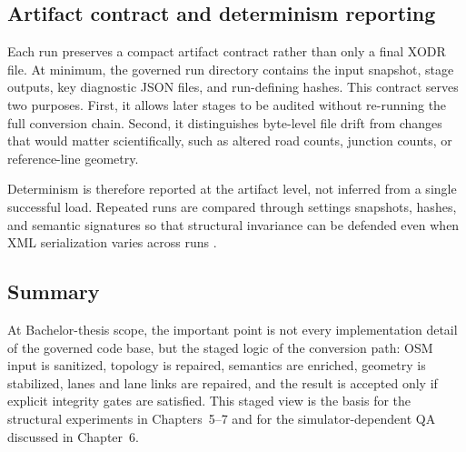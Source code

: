 \subsection{Artifact contract and determinism reporting}
\label{sec:artifact_contract_pipeline}
Each run preserves a compact artifact contract rather than only a final XODR file. At minimum, the governed run directory contains the input snapshot, stage outputs, key diagnostic JSON files, and run-defining hashes. This contract serves two purposes. First, it allows later stages to be audited without re-running the full conversion chain. Second, it distinguishes byte-level file drift from changes that would matter scientifically, such as altered road counts, junction counts, or reference-line geometry.

Determinism is therefore reported at the artifact level, not inferred from a single successful load. Repeated runs are compared through settings snapshots, hashes, and semantic signatures so that structural invariance can be defended even when XML serialization varies across runs \cite{peng2011reproducible,sandve2013reproducible}.

\subsection{Summary}
At Bachelor-thesis scope, the important point is not every implementation detail of the governed code base, but the staged logic of the conversion path: OSM input is sanitized, topology is repaired, semantics are enriched, geometry is stabilized, lanes and lane links are repaired, and the result is accepted only if explicit integrity gates are satisfied. This staged view is the basis for the structural experiments in Chapters~5--7 and for the simulator-dependent QA discussed in Chapter~6.
